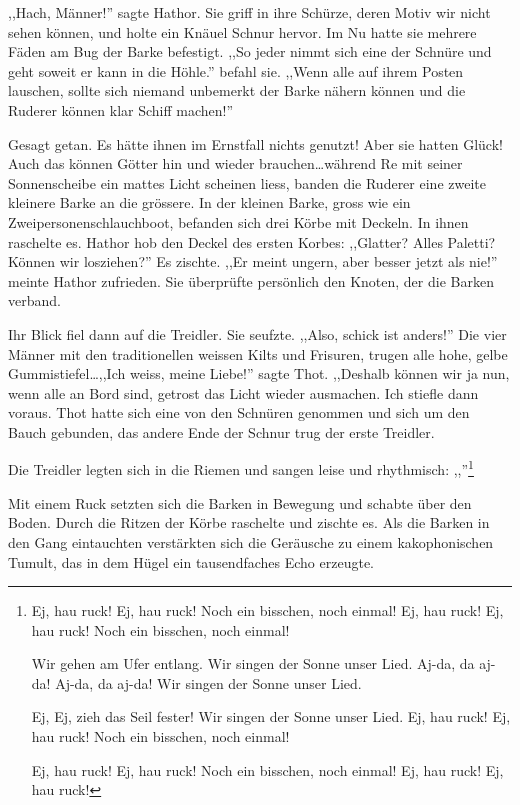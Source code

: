 \documentclass[11pt,titlepage,a5paper]{book}
\begin{document}
,,Hach, Männer!'' sagte Hathor. Sie griff in ihre Schürze, deren Motiv wir nicht sehen können, und holte ein Knäuel Schnur hervor. Im Nu hatte sie mehrere Fäden am Bug der Barke befestigt. ,,So jeder nimmt sich eine der Schnüre und geht soweit er kann in die Höhle.'' befahl sie. ,,Wenn alle auf ihrem Posten lauschen, sollte sich niemand unbemerkt der Barke nähern können und die Ruderer können klar Schiff machen!''

Gesagt getan. Es hätte ihnen im Ernstfall nichts genutzt! Aber sie hatten Glück! Auch das können Götter hin und wieder brauchen\dots während Re mit seiner Sonnenscheibe ein mattes Licht scheinen liess, banden die Ruderer eine zweite kleinere Barke an die grössere. In der kleinen Barke, gross wie ein Zweipersonenschlauchboot, befanden sich drei Körbe mit Deckeln. In ihnen raschelte es. Hathor hob den Deckel des ersten Korbes: ,,Glatter? Alles Paletti? Können wir losziehen?'' Es zischte. ,,Er meint ungern, aber besser jetzt als nie!'' meinte Hathor zufrieden. Sie überprüfte persönlich den Knoten, der die Barken verband. 

Ihr Blick fiel dann auf die Treidler. Sie seufzte. ,,Also, schick ist anders!'' Die vier Männer mit den traditionellen weissen Kilts und Frisuren, trugen alle hohe, gelbe Gummistiefel\dots ,,Ich weiss, meine Liebe!'' sagte Thot. ,,Deshalb können wir ja nun, wenn alle an Bord sind, getrost das Licht wieder ausmachen. Ich stiefle dann voraus. Thot hatte sich eine von den Schnüren genommen und sich um den Bauch gebunden, das andere Ende der Schnur trug der erste Treidler.


Die Treidler legten sich in die Riemen und sangen leise und rhythmisch: ,,''\footnote{Ej, hau ruck!
Ej, hau ruck!
Noch ein bisschen, noch einmal!
Ej, hau ruck!
Ej, hau ruck!
Noch ein bisschen, noch einmal!

Wir gehen am Ufer entlang.
Wir singen der Sonne unser Lied.
Aj-da, da aj-da!
Aj-da, da aj-da!
Wir singen der Sonne unser Lied.

Ej, Ej, zieh das Seil fester!
Wir singen der Sonne unser Lied.
Ej, hau ruck!
Ej, hau ruck!
Noch ein bisschen, noch einmal!

Ej, hau ruck!
Ej, hau ruck!
Noch ein bisschen, noch einmal!
Ej, hau ruck!
Ej, hau ruck! }

Mit einem Ruck setzten sich die Barken in Bewegung und schabte über den Boden. Durch die Ritzen der Körbe raschelte und zischte es. Als die Barken in den Gang eintauchten verstärkten sich die Geräusche zu einem kakophonischen Tumult, das in dem Hügel ein tausendfaches Echo erzeugte. 
\end{document}
